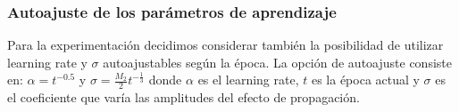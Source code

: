 \documentclass[informe.tex]{subfiles}
\begin{document}
	\subsubsection{Autoajuste de los parámetros de aprendizaje}
	  Para la experimentación decidimos considerar también la posibilidad de utilizar learning rate y $\sigma$ autoajustables según la época. La opción de autoajuste consiste en: $\alpha = t^{-0.5}$ y $\sigma = \frac{M_2}{2}t^{-\frac{1}{3}}$ donde $\alpha$ es el learning rate, $t$ es la época actual y $\sigma$ es el coeficiente que varía las amplitudes del efecto de propagación.
\end{document}
